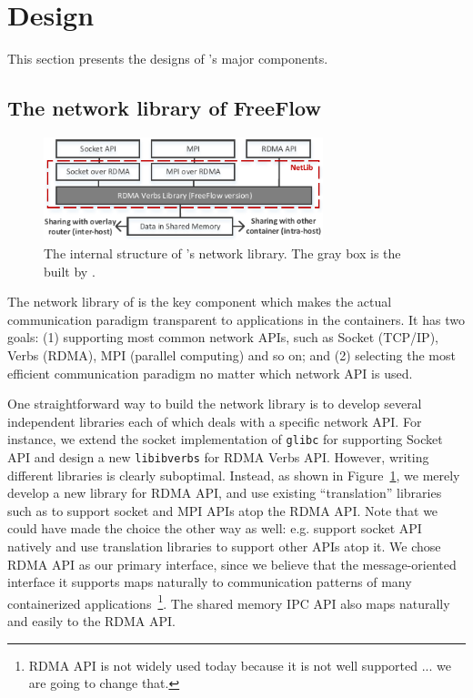 \section{Design} \label{sec:design}

This section presents the designs of \sysname's major components. 

\subsection{The network library of FreeFlow}
\label{subsec:netlib}

\begin{figure}[t!] 
     \centering 
     \includegraphics[width=3.2in]{figures/netlib.pdf} 
    \caption{\label{fig:netlib} The internal structure of \sysname's network library. The gray box is the built by \sysname.} 
\end{figure} 

The network library of \sysname is the key component which makes the actual
communication paradigm transparent to applications in the containers.  It has
two goals: (1) supporting most common network APIs, such as Socket (TCP/IP),
Verbs (RDMA), MPI (parallel computing) and so on; and (2) selecting the most
efficient communication paradigm no matter which network API is used. 

One straightforward way to build the network library is to develop several
independent libraries each of which deals with a specific network API.  For
instance, we extend the socket implementation of \texttt{glibc} for supporting 
Socket API and design a new \texttt{libibverbs} for RDMA Verbs API. However, writing different libraries is
clearly suboptimal. Instead, as shown in  Figure~\ref{fig:netlib}, we merely
develop a new library for RDMA API, and use existing ``translation'' libraries
such as \cite{rsockets,sdp,rfc7609,mpi-rdma} to support socket and MPI APIs
atop the RDMA API. Note that we could have made the choice the other way as
well: e.g. support socket API natively and use translation libraries to support
other APIs atop it. We chose RDMA API as our primary interface, since we believe
that the message-oriented interface it supports maps naturally to communication
patterns of many containerized applications~\footnote{RDMA API is not widely
used today because it is not well supported ... we are going to change that.}.
The shared memory IPC API also maps naturally and easily to the RDMA API.

